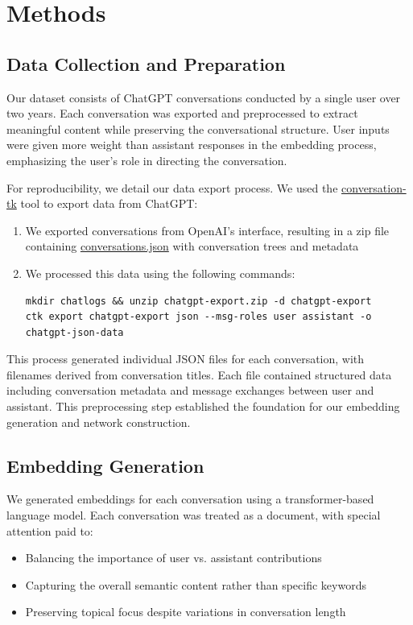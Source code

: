 \documentclass[10pt, a4paper]{article}
\begin{document}
\section{Methods}

\subsection{Data Collection and Preparation}

Our dataset consists of ChatGPT conversations conducted by a single user over two years. Each conversation was exported and preprocessed to extract meaningful content while preserving the conversational structure. User inputs were given more weight than assistant responses in the embedding process, emphasizing the user's role in directing the conversation.

For reproducibility, we detail our data export process. We used the \url{conversation-tk} tool \cite{ctk2024} to export data from ChatGPT:

\begin{enumerate}
    \item We exported conversations from OpenAI's interface, resulting in a zip file containing \url{conversations.json} with conversation trees and metadata
    \item We processed this data using the following commands:
    \begin{lstlisting}[basicstyle=\ttfamily\footnotesize, breaklines=true, breakatwhitespace=true, columns=flexible]
mkdir chatlogs && unzip chatgpt-export.zip -d chatgpt-export
ctk export chatgpt-export json --msg-roles user assistant -o chatgpt-json-data
    \end{lstlisting}
\end{enumerate}

This process generated individual JSON files for each conversation, with filenames derived from conversation titles. Each file contained structured data including conversation metadata and message exchanges between user and assistant. This preprocessing step established the foundation for our embedding generation and network construction.

\subsection{Embedding Generation}

We generated embeddings for each conversation using a transformer-based language model. Each conversation was treated as a document, with special attention paid to:
\begin{itemize}
    \item Balancing the importance of user vs. assistant contributions
    \item Capturing the overall semantic content rather than specific keywords
    \item Preserving topical focus despite variations in conversation length
\end{itemize}
\end{document}

